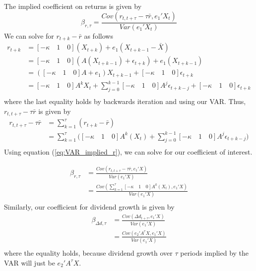 \documentclass[11pt,letter]{article}
\begin{document}
The implied coefficient on returns is given by
\begin{equation*}
	\beta_{r, \tau} = \frac{Cov(r_{t, t+\tau} - \tau \bar{r}, e_{1}'X_t)}{Var(e_{1}'X_t)}
\end{equation*}
We can solve for $r_{t+k} - \bar{r}$ as follows
\begin{equation}
\begin{split}
	r_{t+k} &= [-\kappa\quad 1 \quad 0] \left(X_{t+k} \right) + e_1 (X_{t+k-1}-\bar{X})\\
	&= [-\kappa\quad 1 \quad 0] \left(A(X_{t+k-1}) + \epsilon_{t+k} \right) + e_1 (X_{t+k-1})\\
	& = ([-\kappa\quad 1 \quad 0]A + e_1) X_{t+k-1} + [-\kappa\quad 1 \quad 0]\epsilon_{t+k}\\
	& = [-\kappa\quad 1 \quad 0] A^k X_t  + \sum_{j = 0}^{k-1}[-\kappa\quad 1 \quad 0] A^j\epsilon_{t+k-j} +[-\kappa\quad 1 \quad 0]\epsilon_{t+k} \\
\end{split}
\label{eq:VAR_implied_r}
\end{equation}
where the last equality holds by backwards iteration and using our VAR. Thus, $r_{t, t+\tau} - \tau \bar{r}$ is given by 
\begin{equation*}
\begin{split}
	r_{t, t+\tau}- \tau \bar{r} &= \sum_{k=1}^{\tau}(r_{t+k}-\bar{r}) \\
&= \sum_{k=1}^{\tau}\bigg([-\kappa\quad 1 \quad 0] A^k(X_t ) + \sum_{j = 0}^{k-1}[-\kappa\quad 1 \quad 0] A^j\epsilon_{t+k-j}\bigg)\\
\end{split}
\end{equation*}
 Using equation (\ref{eq:VAR_implied_r}), we can solve for our coefficient of interest. 

\begin{equation*}
	\begin{split}
     \beta_{r, \tau} &= \frac{Cov(r_{t, t+\tau} - \tau \bar{r}, e_{1}'X)}{Var(e_{1}'X)}\\
     &= \frac{Cov(\sum_{k=1}^{\tau}[-\kappa\quad 1 \quad 0] A^k(X_t ), e_{1}'X)}{Var(e_{1}'X)}\\
	\end{split}
\end{equation*}
Similarly, our coefficient for dividend growth is given by
\begin{equation*}
	\begin{split}
		\beta_{\Delta d, \tau} &= \frac{Cov(\Delta d_{t + \tau}, e_{1}'X)}{Var(e_{1}'X)}\\
		& = \frac{Cov(e_2' A^\tau X, e_{1}'X)}{Var(e_{1}'X)}\\
	\end{split}
\end{equation*}
where the equality holds, because dividend growth over $\tau$ periods implied by the VAR will just be $e_2' A^\tau X$. 
\end{document}
